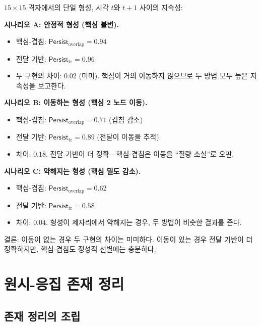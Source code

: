 \begin{example}[두 구현의 비교]
\label{ex:persist-comparison}
$15 \times 15$ 격자에서의 단일 형성, 시각 $t$와 $t+1$ 사이의 지속성:

\textbf{시나리오 A: 안정적 형성 (핵심 불변).}
\begin{itemize}
    \item 핵심-겹침: $\mathsf{Persist}_{\mathrm{overlap}} = 0.94$
    \item 전달 기반: $\mathsf{Persist}_{\mathrm{tr}} = 0.96$
    \item 두 구현의 차이: $0.02$ (미미). 핵심이 거의 이동하지 않으므로 두 방법 모두 높은 지속성을 보고한다.
\end{itemize}

\textbf{시나리오 B: 이동하는 형성 (핵심 2 노드 이동).}
\begin{itemize}
    \item 핵심-겹침: $\mathsf{Persist}_{\mathrm{overlap}} = 0.71$ (겹침 감소)
    \item 전달 기반: $\mathsf{Persist}_{\mathrm{tr}} = 0.89$ (전달이 이동을 추적)
    \item 차이: $0.18$. 전달 기반이 더 정확---핵심-겹침은 이동을 ``질량 소실''로 오판.
\end{itemize}

\textbf{시나리오 C: 약해지는 형성 (핵심 밀도 감소).}
\begin{itemize}
    \item 핵심-겹침: $\mathsf{Persist}_{\mathrm{overlap}} = 0.62$
    \item 전달 기반: $\mathsf{Persist}_{\mathrm{tr}} = 0.58$
    \item 차이: $0.04$. 형성이 제자리에서 약해지는 경우, 두 방법이 비슷한 결과를 준다.
\end{itemize}

결론: 이동이 없는 경우 두 구현의 차이는 미미하다. 이동이 있는 경우 전달 기반이 더 정확하지만, 핵심-겹침도 정성적 선별에는 충분하다.
\end{example}


\section{원시-응집 존재 정리}
\label{sec:proto-cohesion-existence}

\subsection{존재 정리의 조립}

